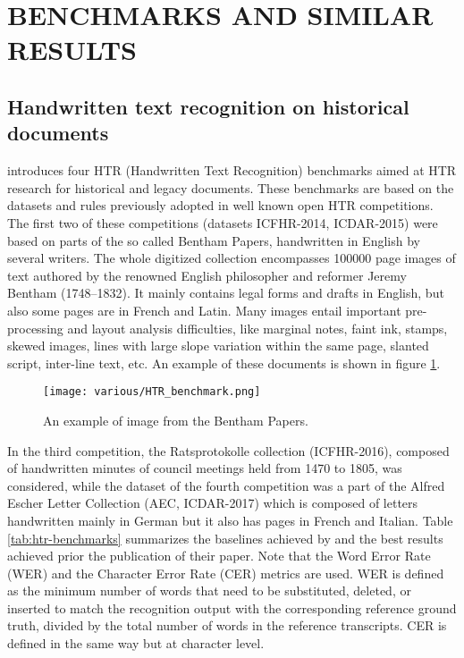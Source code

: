 \section{\uppercase{Benchmarks and similar results}}
\label{sec:stateofart}

\subsection{Handwritten text recognition on historical documents}
\label{ssec:historicaldocuments}

\citeauthor{Sanchez2019-pi}\cite{Sanchez2019-pi} introduces four HTR (Handwritten Text Recognition) benchmarks aimed at HTR research for historical and legacy documents. These benchmarks are based on the datasets and rules previously adopted in well known open HTR competitions. The first two of these competitions (datasets ICFHR-2014, ICDAR-2015) were based on parts of the so called Bentham Papers, handwritten in English by several writers. The whole digitized collection encompasses 100000 page images of text authored by the renowned English philosopher and reformer Jeremy Bentham (1748–1832). It mainly contains legal forms and drafts in English, but also some pages are in French and Latin. Many images entail important pre-processing and layout analysis difficulties, like marginal notes, faint ink, stamps, skewed images, lines with large slope variation within the same page, slanted script, inter-line text, etc. An example of these documents is shown in figure \ref{fig:HTRbenchmark}.

\begin{figure}[htb]
	\caption{An example of image from the Bentham Papers.}
	\centering
	\texttt{[image: various/HTR\_benchmark.png]}
	\label{fig:HTRbenchmark}
\end{figure}

In the third competition, the Ratsprotokolle collection (ICFHR-2016), composed of handwritten minutes of council meetings held from 1470 to 1805, was considered, while the dataset of the fourth competition was a part of the Alfred Escher Letter Collection (AEC, ICDAR-2017) which is composed of letters handwritten mainly in German but it also has pages in French and Italian. Table \ref{tab:htr-benchmarks} summarizes the baselines achieved by \cite{Sanchez2019-pi} and the best results achieved prior the publication of their paper. Note that the Word Error Rate (WER) and the Character Error Rate (CER) metrics are used. WER is defined as the minimum number of words that need to be substituted, deleted, or inserted to match the recognition output with the corresponding reference ground truth, divided by the total number of words in the reference transcripts. CER is defined in the same way but at character level.


